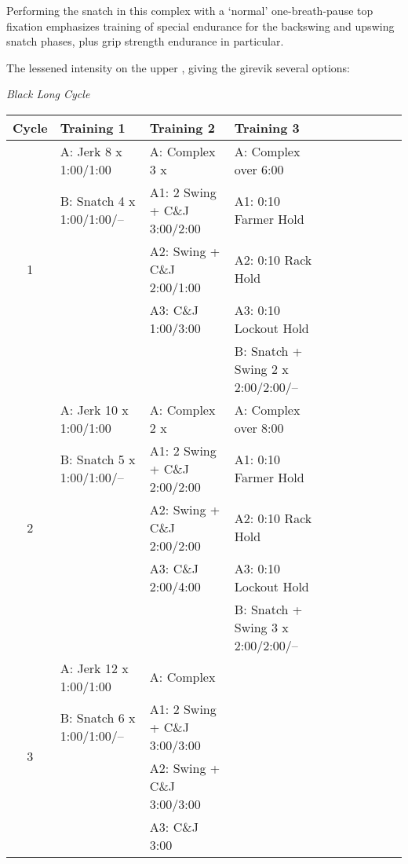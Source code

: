 \documentclass[a4paper,11pt,oneside]{article}
\begin{document}
Performing the snatch in this 
complex with a `normal' one-breath-pause top fixation emphasizes training of special 
endurance for the backswing and upswing snatch phases, plus grip strength endurance in particular. 



The lessened intensity on the upper 
, giving the girevik several options:


\emph{Black Long Cycle}

\newpage
\begin{tabular}{clllllllll}

Cycle & Training 1 & Training 2 & Training 3 \\

\hline

\multirow{5}{*}{1} 	& A: Jerk 8 x 1:00/1:00 		& A: Complex 3 x 					& A: Complex over 6:00 \\
				 	& B: Snatch 4 x 1:00/1:00/-- 	& A1: 2 Swing + C\&J 3:00/2:00 		& A1: 0:10 Farmer Hold \\
  					&								& A2: Swing + C\&J 2:00/1:00		& A2: 0:10 Rack Hold \\
  					&								& A3: C\&J 1:00/3:00 				& A3: 0:10 Lockout Hold \\
  					&								&									& B: Snatch + Swing 2 x 2:00/2:00/-- \\

\hline

\multirow{5}{*}{2} 	& A: Jerk 10 x 1:00/1:00 		& A: Complex 2 x 					& A: Complex over 8:00 \\
					& B: Snatch 5 x 1:00/1:00/-- 	& A1: 2 Swing + C\&J 2:00/2:00 		& A1: 0:10 Farmer Hold \\
  					& 								& A2: Swing + C\&J 2:00/2:00		& A2: 0:10 Rack Hold \\
  					& 								& A3: C\&J 2:00/4:00 				& A3: 0:10 Lockout Hold \\
  					&								&									& B: Snatch + Swing 3 x 2:00/2:00/-- \\

\hline

\multirow{4}{*}{3} 	& A: Jerk 12 x 1:00/1:00 		& A: Complex \\
					& B: Snatch 6 x 1:00/1:00/-- 	& A1: 2 Swing + C\&J 3:00/3:00 \\
  					& 								& A2: Swing + C\&J 3:00/3:00 \\
  					& 								& A3: C\&J 3:00 \\

\hline
\end{tabular}



\end{document}
